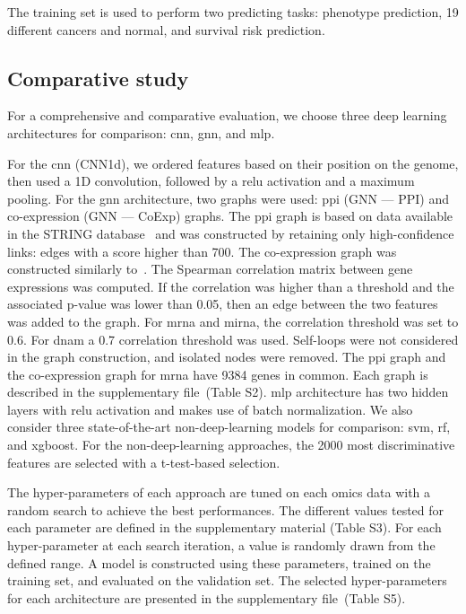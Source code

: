 \documentclass[../main.tex]{subfiles}
\begin{document}
The training set is used to perform two predicting tasks: phenotype prediction, 19 different cancers and normal, and survival risk prediction.

\subsection{Comparative study}
For a comprehensive and comparative evaluation, we choose three deep learning architectures for comparison: \gls{cnn}, \gls{gnn}, and \gls{mlp}.

For the \gls{cnn} (CNN1d), we ordered features based on their position on the genome, then used a 1D convolution, followed by a \gls{relu} activation and a maximum pooling.
For the \gls{gnn} architecture, two graphs were used: \gls{ppi} (GNN --- PPI) and co-expression (GNN --- CoExp) graphs.
The \gls{ppi} graph is based on data available in the STRING database~\cite{Szklarczyk2020} and was constructed by retaining only high-confidence links: edges with a score higher than 700.
The co-expression graph was constructed similarly to~\cite{ramirezClassificationCancerTypes2020}.
The Spearman correlation matrix between gene expressions was computed.
If the correlation was higher than a threshold and the associated p-value was lower than 0.05, then an edge between the two features was added to the graph.
For \gls{mrna} and \gls{mirna}, the correlation threshold was set to 0.6.
For \gls{dnam} a 0.7 correlation threshold was used.
Self-loops were not considered in the graph construction, and isolated nodes were removed.
The \gls{ppi} graph and the co-expression graph for \gls{mrna} have 9384 genes in common.
Each graph is described in the supplementary file~(Table S2).
\Gls{mlp} architecture has two hidden layers with \gls{relu} activation and makes use of batch normalization.
We also consider three state-of-the-art non-deep-learning models for comparison: \gls{svm}, \gls{rf}, and \gls{xgboost}.
For the non-deep-learning approaches, the 2000 most discriminative features are selected with a t-test-based selection.

The hyper-parameters of each approach are tuned on each omics data with a random search to achieve the best performances.
The different values tested for each parameter are defined in the supplementary material (Table S3).
For each hyper-parameter at each search iteration, a value is randomly drawn from the defined range.
A model is constructed using these parameters, trained on the training set, and evaluated on the validation set.
The selected hyper-parameters for each architecture are presented in the supplementary file~(Table S5).
\end{document}
